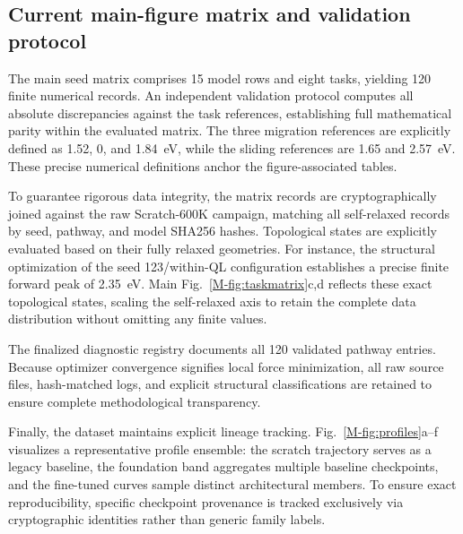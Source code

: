 \documentclass[pdflatex,sn-mathphys-num]{sn-jnl}
\begin{document}
\subsection{Current main-figure matrix and validation protocol}\label{sec:matrix_validation}
The main seed matrix comprises 15 model rows and eight tasks, yielding 120 finite numerical records. An independent validation protocol computes all absolute discrepancies against the task references, establishing full mathematical parity within the evaluated matrix. The three migration references are explicitly defined as 1.52, 0, and 1.84~eV, while the sliding references are 1.65 and 2.57~eV. These precise numerical definitions anchor the figure-associated tables.

To guarantee rigorous data integrity, the matrix records are cryptographically joined against the raw Scratch-600K campaign, matching all self-relaxed records by seed, pathway, and model SHA256 hashes. Topological states are explicitly evaluated based on their fully relaxed geometries. For instance, the structural optimization of the seed 123/within-QL configuration establishes a precise finite forward peak of 2.35~eV. Main Fig.~\ref{M-fig:taskmatrix}c,d reflects these exact topological states, scaling the self-relaxed axis to retain the complete data distribution without omitting any finite values.

The finalized diagnostic registry documents all 120 validated pathway entries. Because optimizer convergence signifies local force minimization, all raw source files, hash-matched logs, and explicit structural classifications are retained to ensure complete methodological transparency.

Finally, the dataset maintains explicit lineage tracking. Fig.~\ref{M-fig:profiles}a--f visualizes a representative profile ensemble: the scratch trajectory serves as a legacy baseline, the foundation band aggregates multiple baseline checkpoints, and the fine-tuned curves sample distinct architectural members. To ensure exact reproducibility, specific checkpoint provenance is tracked exclusively via cryptographic identities rather than generic family labels.
\end{document}
